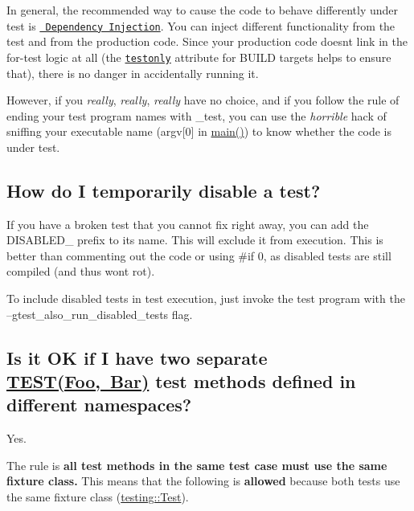 In general, the recommended way to cause the code to behave differently under test is \href{https://en.wikipedia.org/wiki/Dependency_injection}{\texttt{ Dependency Injection}}. You can inject different functionality from the test and from the production code. Since your production code doesn\textquotesingle{}t link in the for-\/test logic at all (the \href{https://docs.bazel.build/versions/master/be/common-definitions.html\#common.testonly}{\texttt{ {\ttfamily testonly}}} attribute for B\+U\+I\+LD targets helps to ensure that), there is no danger in accidentally running it.

However, if you {\itshape really}, {\itshape really}, {\itshape really} have no choice, and if you follow the rule of ending your test program names with {\ttfamily \+\_\+test}, you can use the {\itshape horrible} hack of sniffing your executable name ({\ttfamily argv\mbox{[}0\mbox{]}} in {\ttfamily \mbox{\hyperlink{3_814_83_2CompilerIdC_2CMakeCCompilerId_8c_a0ddf1224851353fc92bfbff6f499fa97}{main()}}}) to know whether the code is under test.

\subsection*{How do I temporarily disable a test?}

If you have a broken test that you cannot fix right away, you can add the D\+I\+S\+A\+B\+L\+E\+D\+\_\+ prefix to its name. This will exclude it from execution. This is better than commenting out the code or using \#if 0, as disabled tests are still compiled (and thus won\textquotesingle{}t rot).

To include disabled tests in test execution, just invoke the test program with the --gtest\+\_\+also\+\_\+run\+\_\+disabled\+\_\+tests flag.

\subsection*{Is it OK if I have two separate {\ttfamily \mbox{\hyperlink{gtest_8h_ad8b332753515c0ab8baada563c2547eb}{T\+E\+S\+T(\+Foo, Bar)}}} test methods defined in different namespaces?}

Yes.

The rule is {\bfseries{all test methods in the same test case must use the same fixture class.}} This means that the following is {\bfseries{allowed}} because both tests use the same fixture class ({\ttfamily \mbox{\hyperlink{classtesting_1_1Test}{testing\+::\+Test}}}).


